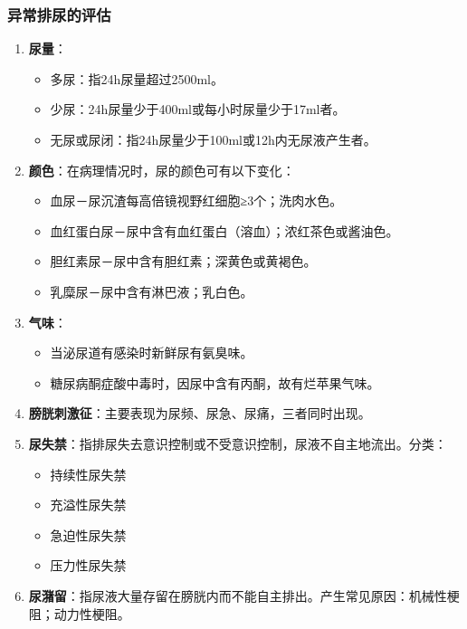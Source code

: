\documentclass[11pt, a4paper]{ctexart}
\begin{document}
\subsubsection{异常排尿的评估}
\begin{enumerate}
    \item \textbf{尿量}：
    \begin{itemize}
        \item 多尿：指24h尿量超过2500ml。
        \item 少尿：24h尿量少于400ml或每小时尿量少于17ml者。
        \item 无尿或尿闭：指24h尿量少于100ml或12h内无尿液产生者。
    \end{itemize}
    \item \textbf{颜色}：在病理情况时，尿的颜色可有以下变化：
    \begin{itemize}
        \item 血尿－尿沉渣每高倍镜视野红细胞≥3个；洗肉水色。
        \item 血红蛋白尿－尿中含有血红蛋白（溶血）；浓红茶色或酱油色。
        \item 胆红素尿－尿中含有胆红素；深黄色或黄褐色。
        \item 乳糜尿－尿中含有淋巴液；乳白色。
    \end{itemize}
    \item \textbf{气味}：
    \begin{itemize}
        \item 当泌尿道有感染时新鲜尿有氨臭味。
        \item 糖尿病酮症酸中毒时，因尿中含有丙酮，故有烂苹果气味。
    \end{itemize}
    \item \textbf{膀胱刺激征}：主要表现为尿频、尿急、尿痛，三者同时出现。
    \item \textbf{尿失禁}：指排尿失去意识控制或不受意识控制，尿液不自主地流出。分类：
    \begin{itemize}
        \item 持续性尿失禁
        \item 充溢性尿失禁
        \item 急迫性尿失禁
        \item 压力性尿失禁
    \end{itemize}
    \item \textbf{尿潴留}：指尿液大量存留在膀胱内而不能自主排出。产生常见原因：机械性梗阻；动力性梗阻。
\end{enumerate}
\end{document}
